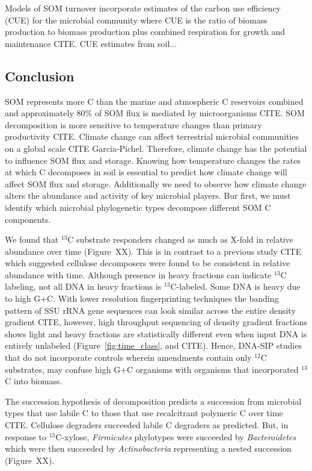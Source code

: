 Models of SOM turnover incorporate estimates of the carbon use efficiency
(CUE) for the microbial community where CUE is the ratio of biomass
production to biomass production plus combined respiration for growth and
maintenance CITE.  CUE estimates from soil... 

\subsection{Conclusion} \label{sub:succession_with_degradation_of_labile_c}
SOM represents more C than the marine and atmospheric C reservoirs
combined and approximately 80\% of SOM flux is mediated by microorganisms
CITE. SOM decomposition is more sensitive to temperature changes than
primary productivity CITE. Climate change can affect terrestrial microbial
communities on a global scale CITE Garcia-Pichel. Therefore, climate
change has the potential to influence SOM flux and storage. Knowing how
temperature changes the rates at which C decomposes in soil is essential
to predict how climate change will affect SOM flux and storage.
Additionally we need to observe how climate change alters the abundance
and activity of key microbial players. Bur first, we must identify which
microbial phylogenetic types decompose different SOM C components.

We found that $^{13}$C substrate responders changed as much as X-fold in
relative abundance over time (Figure~XX). This is in contrast to
a previous study CITE which suggested cellulose decomposers were found to
be consistent in relative abundance with time. Although presence in heavy
fractions can indicate $^{13}$C labeling, not all DNA in heavy fractions
is $^{13}$C-labeled. Some DNA is heavy due to high G+C.
With lower resolution fingerprinting techniques the banding pattern of SSU
rRNA gene sequences can look similar across the entire density gradient
CITE, however, high throughput sequencing of density gradient fractions
shows light and heavy fractions are statistically different even when
input DNA is entirely unlabeled (Figure~\ref{fig:time_class}, and CITE).
Hence, DNA-SIP studies that do not incorporate controls wherein amendments
contain only $^{12}$C substrates, may confuse high G+C organisms with
organisms that incorporated $^{13}$C into biomass. 

The succession hypothesis of decomposition predicts a succession from
microbial types that use labile C to those that use recalcitrant polymeric
C over time CITE. Cellulose degraders succeeded labile C degraders as
predicted. But, in response to $^{13}$C-xylose,  \textit{Firmicutes}
phylotypes were succeeded by \textit{Bacteroidetes} which were then
succeeded by \textit{Actinobacteria} representing a nested succession
(Figure~XX). 

